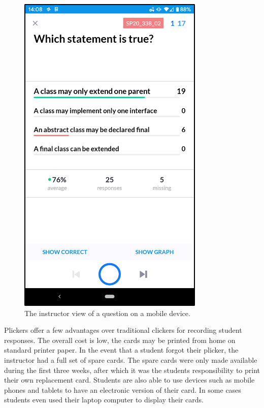 \documentclass[12pt]{article}
\begin{document}
\begin{figure}[ht]
  \centering
  \includegraphics[]{instructor_view.png}
  \caption{The instructor view of a question on a mobile device.}
  \label{fig:plicker_instructor_view}
\end{figure}

Plickers offer a few advantages over traditional clickers for recording student responses. The overall cost is low, the cards may be printed from home on standard printer paper. In the event that a student forgot their plicker, the instructor had a full set of spare cards. The spare cards were only made available during the first three weeks, after which it was the students responsibility to print their own replacement card. Students are also able to use devices such as mobile phones and tablets to have an electronic version of their card.  In some cases students even used their laptop computer to display their cards.

\end{document}
